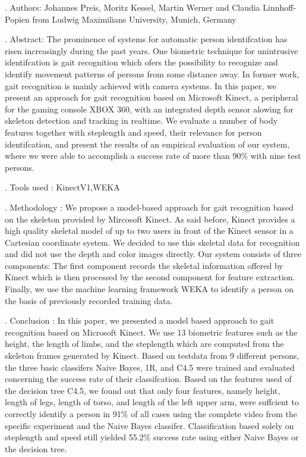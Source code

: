 . Authors:
\noindent Johannes Preis, Moritz Kessel, Martin Werner and Claudia Linnhoff-Popien from Ludwig Maximilians University, Munich, Germany

. Abstract:
\noindent The prominence of systems for automatic person identifcation has risen increasingly during the past years. One biometric technique for unintrusive identifcation is gait recognition which ofers the possibility to recognize and
identify movement patterns of persons from some distance away. In former work, gait recognition is mainly achieved with camera systems. In this paper, we present an approach for gait recognition based on Microsoft Kinect, a peripheral for the gaming console XBOX 360, with an integrated depth
sensor alowing for skeleton detection and tracking in realtime. We evaluate a number of body features together with steplength and speed, their relevance for person identifcation, and present the results of an empirical evaluation of our system, where we were able to accomplish a success rate of more than 90\% with nine test persons.

. Tools used :
\noindent KinectV1,WEKA

. Methodology :
\noindent We propose a model-based approach for gait recognition based on the skeleton provided by Mircosoft Kinect. As said before, Kinect provides a high quality skeletal model of up to two users in front of the Kinect sensor in a Cartesian coordinate system. We decided to use this skeletal data for recognition and did not use the depth and color images directly. Our system consists of three components: The first component records the skeletal information offered by Kinect which is then processed by the second component for feature extraction. Finally, we use the machine learning framework WEKA to identify a person on the basis of previously recorded training data.

. Conclusion :
\noindent In this paper, we presented a model based approach to gait recognition based on Microsoft Kinect. We use 13 biometric features such as the height, the length of limbs, and the
steplength which are computed from the skeleton frames generated by Kinect. Based on testdata from 9 different persons, the three basic classifers Naive Bayes, 1R, and C4.5 were trained and evaluated concerning the success rate of their classifcation. Based on the features used of the decision tree C4.5, we found out that only four features, namely height, length of legs, length of torso, and length of the left upper arm, were suffcient to correctly identify a person in 91\% of all cases using the complete video from the
specific experiment and the Naive Bayes classifer. Classification based solely on steplength and speed still yielded 55.2\% success rate using either Naive Bayes or the decision tree.
